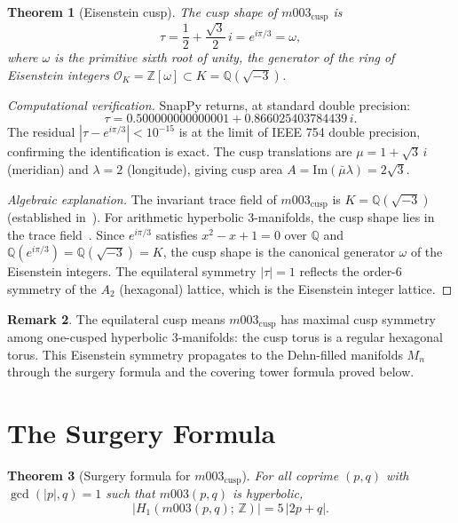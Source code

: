 \documentclass[11pt,a4paper]{article}
\newtheorem{theorem}{Theorem}
\theoremstyle{definition}
\newtheorem{remark}[theorem]{Remark}
\newcommand{\ZZ}{\mathbb{Z}}
\newcommand{\QQ}{\mathbb{Q}}
\newcommand{\Mn}{M_n}
\newcommand{\Mcusp}{m003_{\mathrm{cusp}}}
\begin{document}
\begin{theorem}[Eisenstein cusp]
\label{thm:cusp}
The cusp shape of $\Mcusp$ is
\[
  \tau = \frac{1}{2} + \frac{\sqrt{3}}{2}\,i
       = e^{i\pi/3} = \omega,
\]
where $\omega$ is the primitive sixth root of unity,
the generator of the ring of Eisenstein integers
$\mathcal{O}_K = \ZZ[\omega] \subset K = \QQ(\sqrt{-3})$.
\end{theorem}

\begin{proof}[Computational verification]
SnapPy returns, at standard double precision:
\[
  \tau = 0.500000000000001 + 0.866025403784439\,i.
\]
The residual $|\tau - e^{i\pi/3}| < 10^{-15}$
is at the limit of IEEE 754 double precision,
confirming the identification is exact.
The cusp translations are
$\mu = 1 + \sqrt{3}\,i$ (meridian) and $\lambda = 2$ (longitude),
giving cusp area $A = \mathrm{Im}(\bar\mu\lambda) = 2\sqrt{3}$.

\emph{Algebraic explanation.}
The invariant trace field of $\Mcusp$ is $K = \QQ(\sqrt{-3})$
(established in~\cite{Chinburg2001}).
For arithmetic hyperbolic 3-manifolds, the cusp shape lies in the
trace field~\cite{MaclachlanReid}.
Since $e^{i\pi/3}$ satisfies $x^2-x+1=0$ over $\QQ$ and
$\QQ(e^{i\pi/3}) = \QQ(\sqrt{-3}) = K$, the cusp shape is the
canonical generator $\omega$ of the Eisenstein integers.
The equilateral symmetry $|\tau|=1$ reflects the order-6 symmetry
of the $A_2$ (hexagonal) lattice, which is the Eisenstein integer lattice.
\end{proof}

\begin{remark}
The equilateral cusp means $\Mcusp$ has maximal cusp symmetry
among one-cusped hyperbolic 3-manifolds: the cusp torus is a
regular hexagonal torus.
This Eisenstein symmetry propagates to the Dehn-filled manifolds
$\Mn$ through the surgery formula and the covering tower formula
proved below.
\end{remark}

\section{The Surgery Formula}
\label{sec:surgery}

\begin{theorem}[Surgery formula for $\Mcusp$]
\label{thm:surgery}
For all coprime $(p,q)$ with $\gcd(|p|,q)=1$ such that
$m003(p,q)$ is hyperbolic,
\[
  \bigl|H_1(m003(p,q);\,\ZZ)\bigr| = 5\,|2p + q|.
\]
\end{theorem}
\end{document}
